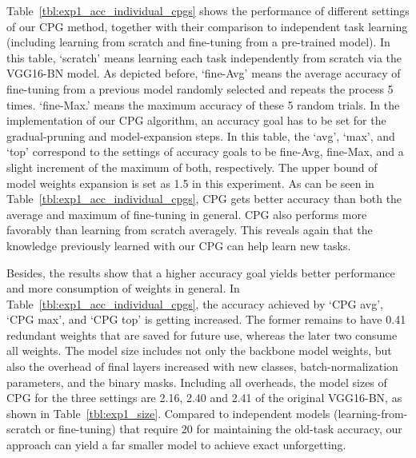 \documentclass{article}
\begin{document}
Table~\ref{tbl:exp1_acc_individual_cpgs} shows the performance of different settings of our CPG method, together with their comparison to independent task learning (including learning from scratch and fine-tuning from a pre-trained model).
In this table, `scratch' means learning each task independently from scratch via the VGG16-BN model.
As depicted before, `fine-Avg' means the average accuracy of fine-tuning from a previous model randomly selected and repeats the process 5 times.
`fine-Max.' means the maximum accuracy of these 5 random trials.
In the implementation of our CPG algorithm, an accuracy goal has to be set for the gradual-pruning and model-expansion steps.
In this table, the `avg', `max', and `top' correspond to the settings of accuracy goals to be fine-Avg, fine-Max, and a slight increment of the maximum of both, respectively.
The upper bound of model weights expansion is set as 1.5 in this experiment.
As can be seen in Table~\ref{tbl:exp1_acc_individual_cpgs}, CPG gets better accuracy than both the average and maximum of fine-tuning in general.
CPG also performs more favorably than learning from scratch averagely.
This reveals again that the knowledge previously learned with our CPG can help learn new tasks.

Besides, the results show that a higher accuracy goal yields better performance and more consumption of weights in general.
In Table~\ref{tbl:exp1_acc_individual_cpgs}, the accuracy achieved by `CPG avg', `CPG max', and `CPG top' is getting increased.
The former remains to have 0.41 redundant weights that are saved for future use, whereas the later two consume all weights.
The model size includes not only the backbone model weights, but also the overhead of final layers increased with new classes, batch-normalization parameters, and the binary masks.
Including all overheads, the model sizes of CPG for the three settings are 2.16, 2.40 and 2.41 of the original VGG16-BN, as shown in Table~\ref{tbl:exp1_size}.
Compared to independent models (learning-from-scratch or fine-tuning) that require 20 for maintaining the old-task accuracy, our approach can yield a far smaller model to achieve exact unforgetting.
\end{document}
